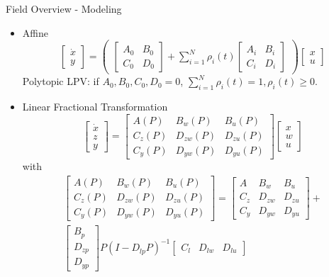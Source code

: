 \begin{frame}{Field Overview - Modeling}
    \begin{itemize}
        \item Affine 
        \begin{equation}  \label{eq:poly_LPV}
\begin{bmatrix}
\dot{x}\\
y
\end{bmatrix} = \begin{pmatrix}\begin{bmatrix}
A_0 & B_0\\
C_0 & D_0
\end{bmatrix} + \sum_{i=1}^{N}\rho_i(t)\begin{bmatrix}
A_i & B_i\\
C_i & D_i
\end{bmatrix} \end{pmatrix} \begin{bmatrix}
x\\
u
\end{bmatrix}
\end{equation}
Polytopic LPV: if $A_0,B_0,C_0,D_0 = 0$, $\sum_{i=1}^{N}\rho_i(t) = 1, \displaystyle \rho_i(t) \geq 0$.
\item Linear Fractional Transformation
\begin{equation} \label{eq:LFT_upper}
\begin{bmatrix}
\dot{x}\\
z\\
y
\end{bmatrix} = \begin{bmatrix}
A(P)		&B_w(P) 	&B_u(P) \\
C_z(P) 	&D_{zw}(P) &D_{zu}(P)\\
C_y(P) 	&D_{yw}(P) &D_{yu}(P)
\end{bmatrix}\begin{bmatrix}
x\\
w\\
u
\end{bmatrix}
\end{equation}
with 
\begin{multline} \label{eq:LFT_theta}
\begin{bmatrix}
A(P)		&B_w(P) 	&B_u(P) \\
C_z(P) 	&D_{zw}(P) &D_{zu}(P)\\
C_y(P) 	&D_{yw}(P) &D_{yu}(P)
\end{bmatrix} = \begin{bmatrix}
A		&B_w 	&B_u\\
C_z 	&D_{zw} &D_{zu}\\
C_y 	&D_{yw} &D_{yu}
\end{bmatrix} + \\ \begin{bmatrix} 
B_p\\
D_{zp}\\
D_{yp}
\end{bmatrix}P(I-D_{lp}P)^{-1} \begin{bmatrix} C_l &D_{lw} &D_{lu}\end{bmatrix}
\end{multline}
    \end{itemize}
\end{frame}

